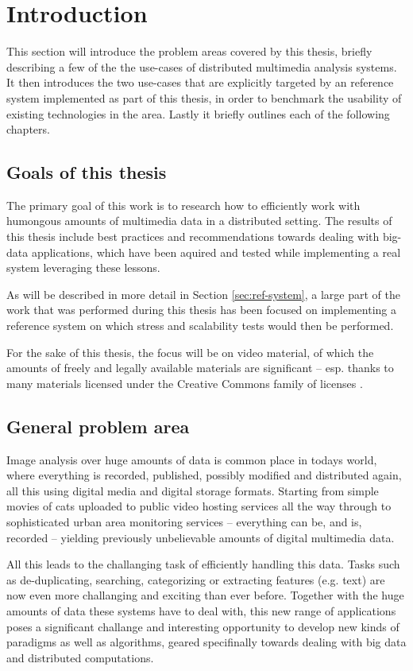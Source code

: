 \chapter{Introduction}
\label{cha:intro}

This section will introduce the problem areas covered by this thesis, briefly describing a few of the the use-cases of distributed multimedia analysis systems. It then introduces the two use-cases that are explicitly targeted by an reference system implemented as part of this thesis, in order to benchmark the usability of existing technologies in the area. Lastly it briefly outlines each of the following chapters.


\section{Goals of this thesis}
The primary goal of this work is to research how to efficiently work with humongous amounts of multimedia data in a distributed setting. The results of this thesis include best practices and recommendations towards dealing with big-data applications, which have been aquired and tested while implementing a real system leveraging these lessons. 

As will be described in more detail in Section \ref{sec:ref-system}, a large part of the work that was performed during this thesis has been focused on implementing a reference system on which stress and scalability tests would then be performed.

For the sake of this thesis, the focus will be on video material, of which the amounts of freely and legally  available materials are significant -- esp. thanks to many materials licensed under the Creative Commons family of licenses \cite{creative-commons}.


\section{General problem area}
Image analysis over huge amounts of data is common place in todays world, where everything is recorded, published, possibly modified and distributed again, all this using digital media and digital storage formats. Starting from simple movies of cats uploaded to public video hosting services all the way through to sophisticated urban area monitoring services -- everything can be, and is, recorded -- yielding previously unbelievable amounts of digital multimedia data.

All this leads to the challanging task of efficiently handling this data. Tasks such as de-duplicating, searching, categorizing or extracting features (e.g. text) are now even more challanging and exciting than ever before. Together with the huge amounts of data these systems have to deal with, this new range of applications poses a significant challange and interesting opportunity to develop new kinds of paradigms as well as algorithms, geared specifinally towards dealing with big data and distributed computations.


